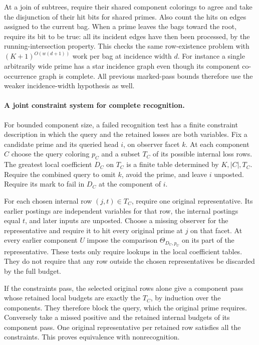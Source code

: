At a join of subtrees, require their shared
component colorings to agree and take the
disjunction of their hit bits for shared primes.
Also count the hits on edges assigned to the
current bag. When a prime leaves the bags toward
the root, require its bit to be true: all its
incident edges have then been processed, by the
running-intersection property. This checks the
same row-existence problem with
$(K+1)^{O(w(d+1))}$ work per bag at incidence
width $d$. For instance a single arbitrarily
wide prime has a star incidence graph even
though its component co-occurrence graph is
complete. All previous marked-pass bounds
therefore use the weaker incidence-width
hypothesis as well.

\paragraph{A joint constraint system for complete recognition.}
For bounded component size, a failed recognition test
has a finite constraint description in which the query
and the retained losses are both variables. Fix a
candidate prime and its queried head $i$, on observer
facet $k$. At each component $C$ choose the query
coloring $p_C$ and a subset $T_C$ of its possible
internal loss rows. The greatest local coefficient
$D_C$ on $T_C$ is a finite table determined by
$K,|C|,T_C$. Require the combined query to omit $k$,
avoid the prime, and leave $i$ unposted. Require its
mark to fail in $D_C$ at the component of $i$.

For each chosen internal row $(j,t)\in T_C$, require
one original representative. Its earlier postings
are independent variables for that row, the internal
postings equal $t$, and later inputs are unposted.
Choose a missing observer for the representative
and require it to hit every original prime at $j$
on that facet. At every earlier component $U$ impose
the comparison $\Theta_{D_U,p_U}$ on its part of the
representative. These tests only require lookups in
the local coefficient tables. They do not require
that any row outside the chosen representatives be
discarded by the full budget.

If the constraints pass, the selected original rows
alone give a component pass whose retained local
budgets are exactly the $T_C$, by induction over
the components. They therefore block the query,
which the original prime requires. Conversely take
a missed positive and the retained internal budgets
of its component pass. One original representative
per retained row satisfies all the constraints.
This proves equivalence with nonrecognition.

